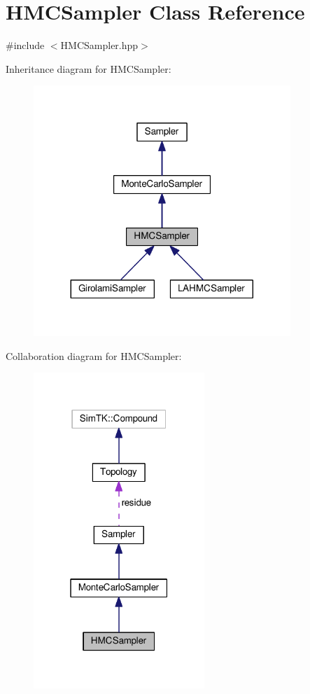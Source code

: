 \hypertarget{classHMCSampler}{}\section{H\+M\+C\+Sampler Class Reference}
\label{classHMCSampler}


{\ttfamily \#include $<$H\+M\+C\+Sampler.\+hpp$>$}



Inheritance diagram for H\+M\+C\+Sampler\+:\nopagebreak
\begin{figure}[H]
\begin{center}
\leavevmode
\includegraphics[width=275pt]{classHMCSampler__inherit__graph}
\end{center}
\end{figure}


Collaboration diagram for H\+M\+C\+Sampler\+:\nopagebreak
\begin{figure}[H]
\begin{center}
\leavevmode
\includegraphics[width=183pt]{classHMCSampler__coll__graph}
\end{center}
\end{figure}
